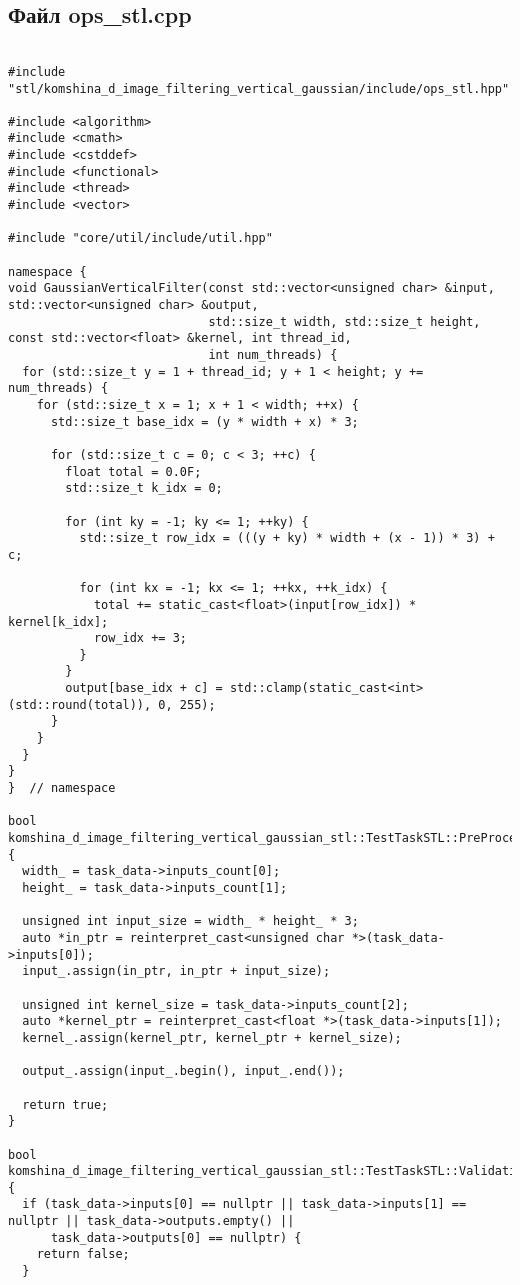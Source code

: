 \documentclass[12pt]{article}
\begin{document}
\subsection*{Файл ops\_stl.cpp}
\begin{lstlisting}

#include "stl/komshina_d_image_filtering_vertical_gaussian/include/ops_stl.hpp"

#include <algorithm>
#include <cmath>
#include <cstddef>
#include <functional>
#include <thread>
#include <vector>

#include "core/util/include/util.hpp"

namespace {
void GaussianVerticalFilter(const std::vector<unsigned char> &input, std::vector<unsigned char> &output,
                            std::size_t width, std::size_t height, const std::vector<float> &kernel, int thread_id,
                            int num_threads) {
  for (std::size_t y = 1 + thread_id; y + 1 < height; y += num_threads) {
    for (std::size_t x = 1; x + 1 < width; ++x) {
      std::size_t base_idx = (y * width + x) * 3;

      for (std::size_t c = 0; c < 3; ++c) {
        float total = 0.0F;
        std::size_t k_idx = 0;

        for (int ky = -1; ky <= 1; ++ky) {
          std::size_t row_idx = (((y + ky) * width + (x - 1)) * 3) + c;

          for (int kx = -1; kx <= 1; ++kx, ++k_idx) {
            total += static_cast<float>(input[row_idx]) * kernel[k_idx];
            row_idx += 3;
          }
        }
        output[base_idx + c] = std::clamp(static_cast<int>(std::round(total)), 0, 255);
      }
    }
  }
}
}  // namespace

bool komshina_d_image_filtering_vertical_gaussian_stl::TestTaskSTL::PreProcessingImpl() {
  width_ = task_data->inputs_count[0];
  height_ = task_data->inputs_count[1];

  unsigned int input_size = width_ * height_ * 3;
  auto *in_ptr = reinterpret_cast<unsigned char *>(task_data->inputs[0]);
  input_.assign(in_ptr, in_ptr + input_size);

  unsigned int kernel_size = task_data->inputs_count[2];
  auto *kernel_ptr = reinterpret_cast<float *>(task_data->inputs[1]);
  kernel_.assign(kernel_ptr, kernel_ptr + kernel_size);

  output_.assign(input_.begin(), input_.end());

  return true;
}

bool komshina_d_image_filtering_vertical_gaussian_stl::TestTaskSTL::ValidationImpl() {
  if (task_data->inputs[0] == nullptr || task_data->inputs[1] == nullptr || task_data->outputs.empty() ||
      task_data->outputs[0] == nullptr) {
    return false;
  }


\end{lstlisting}
\end{document}

